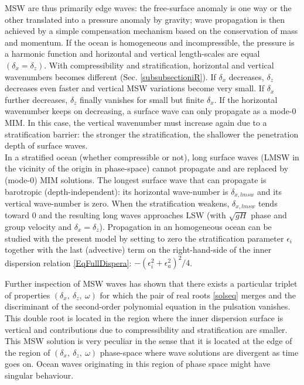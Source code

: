 MSW are thus primarily edge waves: the free-surface anomaly is one way or the other translated into a pressure anomaly by gravity; wave propagation is then achieved by a simple compensation mechanism based on the conservation of mass and momentum. If the ocean is homogeneous and incompressible, the pressure is a harmonic function and horizontal and vertical length-scales are equal $(\delta_x=\delta_z)$. With compressibility and stratification, horizontal and vertical wavenumbers becomes different (Sec. \ref{subsubsectioniR}). If $\delta_x$ decreases, $\delta_z$ decreases even faster and vertical MSW variations become very small. If $\delta_x$ further decreases, $\delta_z$ finally vanishes for small but finite $\delta_x$. If the horizontal wavenumber keeps on decreasing, a surface wave can only propagate as a mode-0 MIM. In this case, the vertical wavenumber must increase again due to a stratification barrier: the stronger the stratification, the shallower the penetration depth of surface waves.\\

In a stratified ocean (whether compressible or not), long surface waves (LMSW in the vicinity of the origin in phase-space) cannot propagate and are replaced by (mode-0) MIM solutions. The longest surface wave that can propagate is barotropic (depth-independent): its horizontal wave-number is $\delta_{x,lmsw}$ and its vertical wave-number is zero. When the stratification weakens, $\delta_{x,lmsw}$ tends toward 0 and the resulting long waves approaches LSW (with $\sqrt{g H}$ phase and group velocity and $\delta_x=\delta_z$).
Propagation in an homogeneous ocean can be studied with the present model by setting to zero the stratification parameter $\epsilon_i$ together with the last (advective) term on the right-hand-side of the inner dispersion relation \ref{EqFullDispera}: $-(\epsilon_i^2+\epsilon_a^2)^2/4$. 

Further inspection of MSW waves has shown that there exists a particular triplet of properties $(\delta_x,\ \delta_z,\ \omega)$ for which the pair of real roots \ref{solseq} merges and the discriminant of the second-order polynomial equation in the pulsation vanishes. This double root is located in the region where the inner dispersion surface is vertical and contributions due to compressibility and stratification are smaller. This MSW solution is very peculiar in the sense that it is located at the edge of the region of $(\delta_x,\ \delta_z,\ \omega)$ phase-space where wave solutions are divergent as time goes on. Ocean waves originating in this region of phase space might have singular behaviour.\\